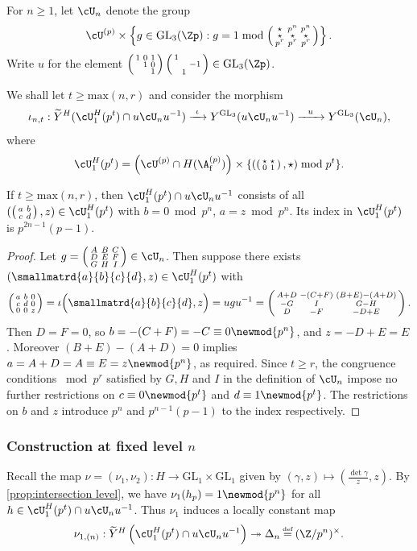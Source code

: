 \documentclass[10pt,reqno,a4paper]{amsart}
\newcommand{\stbt}[4]{\left(\begin{smallmatrix}#1 & #2\\#3&#4\end{smallmatrix}\right)}
\newcommand{\subf}{_{\mathrm{f}}}
\newcommand{\GL}{\mathrm{GL}}
\newcommand{\smallthreemat}[9]{\left(\begin{smallmatrix}
#1 & #2 & #3 \\
#4 & #5 & #6 \\
#7 & #8 & #9\end{smallmatrix}\right)}
\begin{document}
\begin{definition}\label{def:U_n}
For $n \ge 1$, let $\cU_n$ denote the group
\[
\cU^{(p)} \times \left\{ g \in \GL_3(\Zp) : g = 1 \bmod
\smallthreemat{\star}{p^n}{p^{n}}{\star}{\star}{\star} {p^{r}}{p^r}{p^r}\right\}.
\]
Write $u$ for the element $\smallthreemat{1}{0}{1}{}{1}{0}{}{}{1}\smallthreemat{1}{}{}{}{}{-1}{}{1}{} \in \GL_3(\Zp)$.
\end{definition}

We shall let $t \geq \mathrm{max}(n,r)$ and consider the morphism
\[
\iota_{n, t}: \widetilde{Y}^H(\cU_{1}^H(p^t) \cap u \cU_n u^{-1}) \xrightarrow{\ \iota\ } Y^{\GL_3}(u \cU_n u^{-1}) \xrightarrow{\ \ u\ \ } Y^{\GL_3}(\cU_n),
\]
where
\[
\cU_{1}^H(p^t) = \left(\cU^{(p)} \cap H(\A\subf^{(p)})\right) \times \{ (\stbt \star\star 0 1, \star) \bmod p^t\}.
\]



\begin{proposition}\label{prop:intersection level}
If $t \ge \mathrm{max}(n,r)$, then $\cU_{1}^H(p^t) \cap u \cU_n u^{-1}$ consists of all $(\stbt a b c d, z) \in \cU_{1}^H(p^t)$ with $b = 0\bmod p^{n}$, $a = z  \bmod p^n$. Its index in $\cU_1^H(p^t)$ is $p^{2n-1}(p-1)$.
\end{proposition}

\begin{proof}
Let $g = \smallthreemat{A}{B}{C}{D}{E}{F}{G}{H}{I} \in \cU_n$. Then suppose there exists $\left(\smallmatrd{a}{b}{c}{d}, z\right)\in \cU_{1}^H(p^t)$ with
\[
\smallthreemat{a}{b}{0}{c}{d}{0}{0}{0}{z} = \iota\Big(\smallmatrd{a}{b}{c}{d}, z\Big) = ugu^{-1} = \smallthreemat{A+D}{-(C+F)}{(B+E) - (A+D)}{-G}{I}{G-H}{D}{-F}{-D+E}.
\]
Then $D=F=0$, so $b = -(C+F) = -C \equiv 0 \newmod{p^n}$, and $z = -D+E = E$. Moreover $(B+E)-(A+D) = 0$ implies $a= A+D = A \equiv E = z \newmod{p^n}$, as required. Since $t \geq r$, the congruence conditions $\bmod p^r$ satisfied by $G,H$ and $I$ in the definition of $\cU_n$ impose no further restrictions on $c \equiv 0 \newmod{p^t}$ and $d \equiv 1 \newmod{p^t}$. The restrictions on $b$ and $z$ introduce $p^n$ and $p^{n-1}(p-1)$ to the index respectively.
\end{proof}



\subsubsection{Construction at fixed level $n$}
Recall the map $\nu = (\nu_1,\nu_2): H \to \GL_1 \times \GL_1$ given by $(\gamma, z) \mapsto (\tfrac{\det \gamma}{z}, z)$. By \cref{prop:intersection level}, we have $\nu_1(h_p) = 1\newmod{p^n}$ for all $h \in \cU_{1}^H(p^t) \cap u \cU_n u^{-1}$. Thus $\nu_1$ induces a locally constant map
\begin{equation}\label{eq:nu_n}
\nu_{1, (n)}: \widetilde{Y}^H\left(\cU_{1}^H(p^t) \cap u \cU_n u^{-1}\right) \twoheadrightarrow \Delta_n \defeq (\Z/p^n)^\times.
\end{equation}
\end{document}

